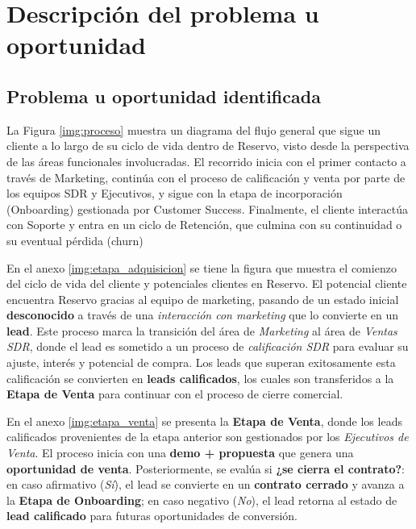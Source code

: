 
\section{Descripción del problema u oportunidad}

\subsection{Problema u oportunidad identificada}


La Figura \ref{img:proceso} muestra un diagrama del flujo general que sigue un cliente a lo largo de su ciclo de vida dentro de Reservo, visto desde la perspectiva de las áreas funcionales involucradas. El recorrido inicia con el primer contacto a través de Marketing, continúa con el proceso de calificación y venta por parte de los equipos SDR y Ejecutivos, y sigue con la etapa de incorporación (Onboarding) gestionada por Customer Success. Finalmente, el cliente interactúa con Soporte y entra en un ciclo de Retención, que culmina con su continuidad o su eventual pérdida (churn)


En el anexo \ref{img:etapa_adquisicion} se tiene la figura que muestra el comienzo del ciclo de vida del cliente y potenciales clientes en Reservo. El potencial cliente encuentra Reservo gracias al equipo de marketing, pasando de un estado inicial \textbf{desconocido} a través de una \textit{interacción con marketing} que lo convierte en un \textbf{lead}. Este proceso marca la transición del área de \textit{Marketing} al área de \textit{Ventas SDR}, donde el lead es sometido a un proceso de \textit{calificación SDR} para evaluar su ajuste, interés y potencial de compra. Los leads que superan exitosamente esta calificación se convierten en \textbf{leads calificados}, los cuales son transferidos a la \textbf{Etapa de Venta} para continuar con el proceso de cierre comercial.

En el anexo \ref{img:etapa_venta} se presenta la \textbf{Etapa de Venta}, donde los leads calificados provenientes de la etapa anterior son gestionados por los \textit{Ejecutivos de Venta}. El proceso inicia con una \textbf{demo + propuesta} que genera una \textbf{oportunidad de venta}. Posteriormente, se evalúa si \textbf{¿se cierra el contrato?}: en caso afirmativo (\textit{Sí}), el lead se convierte en un \textbf{contrato cerrado} y avanza a la \textbf{Etapa de Onboarding}; en caso negativo (\textit{No}), el lead retorna al estado de \textbf{lead calificado} para futuras oportunidades de conversión.


